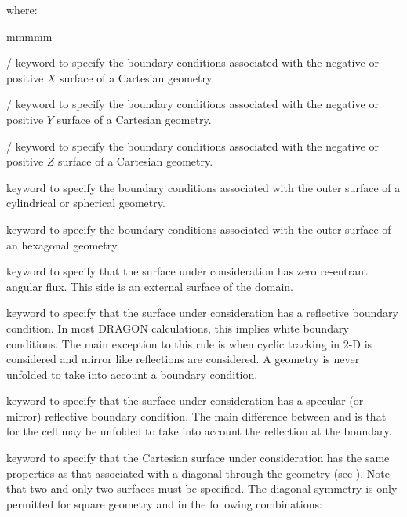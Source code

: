 \noindent
where: 

\begin{ListeDeDescription}{mmmmm}

\item[\moc{X-}/\moc{X+}] keyword to specify the boundary conditions associated with the
negative or positive $X$ surface of a Cartesian geometry.

\item[\moc{Y-}/\moc{Y+}] keyword to specify the boundary conditions associated with the
negative or positive $Y$ surface of a Cartesian geometry.

\item[\moc{Z-}/\moc{Z+}] keyword to specify the boundary conditions associated with the
negative or positive $Z$ surface of a Cartesian geometry.          

\item[\moc{R+}] keyword to specify the boundary conditions associated with the
outer surface of a cylindrical or spherical geometry.

\item[\moc{HBC}] keyword to specify the boundary conditions associated with
the outer surface of an hexagonal geometry.

\item[\moc{VOID}] keyword to specify that the surface under consideration has
zero re-entrant angular flux. This side is an external surface of the domain.

\item[\moc{REFL}] keyword to specify that the surface under consideration has a reflective boundary condition. In 
most DRAGON calculations, this implies white boundary conditions. The main exception to this 
rule is when cyclic tracking in 2-D is considered and mirror like reflections are considered. A geometry is never
unfolded to take into account a  boundary condition.

\item[\moc{SSYM}] keyword to specify that the surface under consideration has a specular (or mirror) reflective boundary condition. The 
main difference between  and  is that for  the cell may be unfolded to take 
into account the reflection at the boundary.

\item[\moc{DIAG}] keyword to specify that the Cartesian surface under
consideration has the same properties as that associated with a diagonal through
the geometry (see ). Note that two and only two  surfaces must be specified.
The diagonal symmetry is only permitted for square geometry and in the following
combinations:  


\end{ListeDeDescription}
